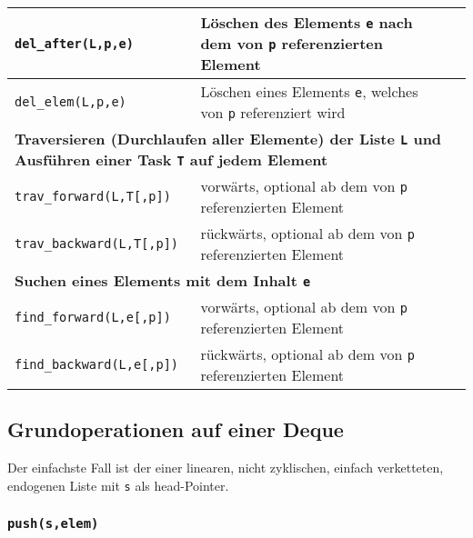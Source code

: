 \begin{longtable}{p{}|p{}|p{}}
	\hline
	\texttt{del\_after(L,p,e)} & Löschen des Elements \texttt{e} nach dem von \texttt{p} referenzierten Element & \\
	\hline
	\texttt{del\_elem(L,p,e)} & Löschen eines Elements \texttt{e}, welches von \texttt{p} referenziert wird & \\
	\hline
	\multicolumn{3}{p{\textwidth}}{\cellcolor{lightgray}\textbf{Traversieren (Durchlaufen aller Elemente) der Liste \texttt{L} und Ausführen einer Task \texttt{T} auf jedem Element}} \\
	\hline
	\texttt{trav\_forward(L,T[,p])} & vorwärts, optional ab dem von \texttt{p} referenzierten Element \\
	\hline
	\texttt{trav\_backward(L,T[,p])} & rückwärts, optional ab dem von \texttt{p} referenzierten Element \\
	\hline
	\multicolumn{3}{p{\textwidth}}{\cellcolor{lightgray}\textbf{Suchen eines Elements mit dem Inhalt \texttt{e}}} \\
	\hline
	\texttt{find\_forward(L,e[,p])} & vorwärts, optional ab dem von \texttt{p} referenzierten Element \\
	\hline
	\texttt{find\_backward(L,e[,p])} & rückwärts, optional ab dem von \texttt{p} referenzierten Element \\
\end{longtable}

\subsection{Grundoperationen auf einer Deque}

Der einfachste Fall ist der einer linearen, nicht zyklischen, einfach verketteten, endogenen Liste mit \texttt{s} als head-Pointer.

\subsubsection*{\texttt{push(s,elem)}}

